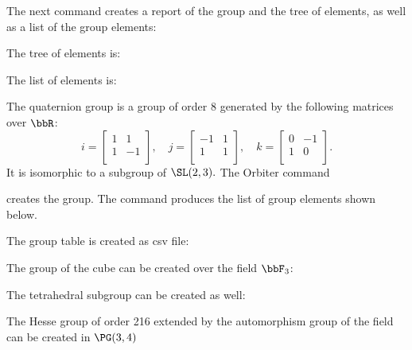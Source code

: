 \bigskip

The next command creates a report of the group and the tree of elements, 
as well as a list of the group elements: 




The tree of elements is:


The list of elements is:



\bigskip


The quaternion group is a group of order $8$ generated by 
the following matrices over $\bbR$:
$$
i = 
\left[
\begin{array}{rr}
1&1\\
1&-1\\
\end{array}
\right], \quad
j = 
\left[
\begin{array}{rr}
-1&1\\
1&1\\
\end{array}
\right], \quad
k = 
\left[
\begin{array}{rr}
0&-1\\
1&0\\
\end{array}
\right].
$$
It is isomorphic to a subgroup of $\SL(2,3).$
The Orbiter command


creates the group. 
The command produces the list of group elements shown below.


The group table is created as csv file:



\bigskip

The group of the cube can be created over the field $\bbF_3$:


The tetrahedral subgroup can be created as well:


The Hesse group of order 216 extended by the automorphism group of the field 
can be created in $\PG(3,4)$




